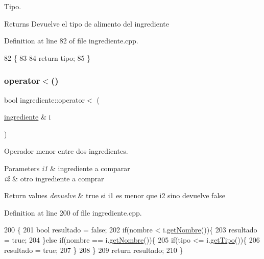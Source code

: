 Tipo. 

\begin{DoxyReturn}{Returns}
Devuelve el tipo de alimento del ingrediente 
\end{DoxyReturn}


Definition at line 82 of file ingrediente.\+cpp.


\begin{DoxyCode}
82                            \{
83 
84     \textcolor{keywordflow}{return} tipo;
85 \}
\end{DoxyCode}
\mbox{\label{classingrediente_a6b70e6c632d6a07bb5536114948f8e3c}} 
\subsubsection{\texorpdfstring{operator$<$()}{operator<()}}
{\footnotesize\ttfamily bool ingrediente\+::operator$<$ (\begin{DoxyParamCaption}\item[{\hyperlink{classingrediente}{ingrediente} \&}]{i }\end{DoxyParamCaption})}



Operador menor entre dos ingredientes. 


\begin{DoxyParams}{Parameters}
{\em i1} & ingrediente a comparar \\
\hline
{\em i2} & otro ingrediente a comprar \\
\hline
\end{DoxyParams}

\begin{DoxyRetVals}{Return values}
{\em devuelve} & true si i1 es menor que i2 sino devuelve false \\
\hline
\end{DoxyRetVals}


Definition at line 200 of file ingrediente.\+cpp.


\begin{DoxyCode}
200                                            \{
201     \textcolor{keywordtype}{bool} resultado = \textcolor{keyword}{false};
202   \textcolor{keywordflow}{if}(nombre < i.\hyperlink{classingrediente_a1bb43a7c4f04f6ef9b85cb599248fb8e}{getNombre}())\{
203     resultado = \textcolor{keyword}{true};
204   \}\textcolor{keywordflow}{else} \textcolor{keywordflow}{if}(nombre == i.\hyperlink{classingrediente_a1bb43a7c4f04f6ef9b85cb599248fb8e}{getNombre}())\{
205     \textcolor{keywordflow}{if}(tipo <= i.\hyperlink{classingrediente_a52fe74f041eba65a8c0a2e006a7686e0}{getTipo}())\{
206       resultado = \textcolor{keyword}{true};
207     \}
208   \}
209   \textcolor{keywordflow}{return} resultado;
210 \}
\end{DoxyCode}
\mbox{\label{classingrediente_a13e14c58eee2955d3fa0383fd704d337}} 
